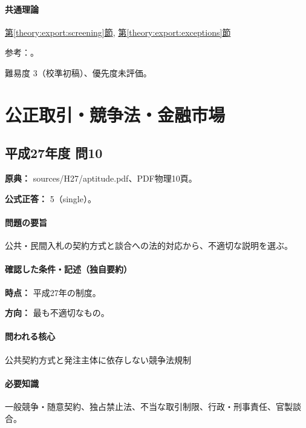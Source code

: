 \paragraph{共通理論} \hyperref[theory:export:screening]{第\ref*{theory:export:screening}節}, \hyperref[theory:export:exceptions]{第\ref*{theory:export:exceptions}節}

\par 参考：\cite{export_overview,export_scope2022,export_current_updates}。

\par 難易度 3（校準初稿）、優先度未評価。

\section{公正取引・競争法・金融市場}

\subsection{平成27年度 問10}
\label{q:h27-reg-apt-10}

\noindent\textbf{原典：} sources/H27/aptitude.pdf、PDF物理10頁。

\textbf{公式正答：} 5（single）。

\paragraph{問題の要旨} 公共・民間入札の契約方式と談合への法的対応から、不適切な説明を選ぶ。

\paragraph{確認した条件・記述（独自要約）}\mbox{}\par

\noindent\textbf{時点：} 平成27年の制度。\par

\noindent\textbf{方向：} 最も不適切なもの。\par

\paragraph{問われる核心} 公共契約方式と発注主体に依存しない競争法規制

\paragraph{必要知識} 一般競争・随意契約、独占禁止法、不当な取引制限、行政・刑事責任、官製談合。

